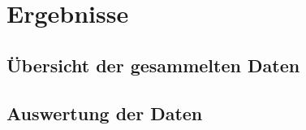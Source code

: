\section{Ergebnisse}
\label{sec:ergebnisse}


\subsection{Übersicht der gesammelten Daten}
\label{sec:ubersicht_der_gesammelten_daten}


\subsection{Auswertung der Daten}
\label{sec:auswertung_der_daten}
